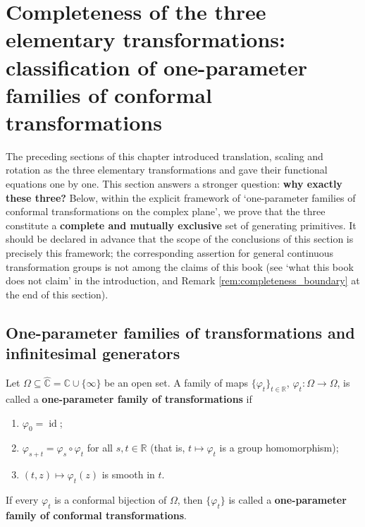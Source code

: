 \section{Completeness of the three elementary transformations: classification of one-parameter families of conformal transformations}
\label{sec:completeness_three_transformations}

The preceding sections of this chapter introduced translation, scaling and rotation as the three elementary transformations and gave their functional equations one by one. This section answers a stronger question: \textbf{why exactly these three?} Below, within the explicit framework of `one-parameter families of conformal transformations on the complex plane', we prove that the three constitute a \textbf{complete and mutually exclusive} set of generating primitives. It should be declared in advance that the scope of the conclusions of this section is precisely this framework; the corresponding assertion for general continuous transformation groups is not among the claims of this book (see `what this book does not claim' in the introduction, and Remark \ref{rem:completeness_boundary} at the end of this section).

\subsection{One-parameter families of transformations and infinitesimal generators}

\begin{definition}\label{def:one_parameter_family}
Let $\Omega\subseteq\hat{\mathbb C}=\mathbb C\cup\{\infty\}$ be an open set. A family of maps $\{\varphi_t\}_{t\in\mathbb R}$, $\varphi_t:\Omega\to\Omega$, is called a \textbf{one-parameter family of transformations} if
\begin{enumerate}[label=(\roman*)]
    \item $\varphi_0=\operatorname{id}$;
    \item $\varphi_{s+t}=\varphi_s\circ\varphi_t$ for all $s,t\in\mathbb R$ (that is, $t\mapsto\varphi_t$ is a group homomorphism);
    \item $(t,z)\mapsto\varphi_t(z)$ is smooth in $t$.
\end{enumerate}
If every $\varphi_t$ is a conformal bijection of $\Omega$, then $\{\varphi_t\}$ is called a \textbf{one-parameter family of conformal transformations}.
\end{definition}

